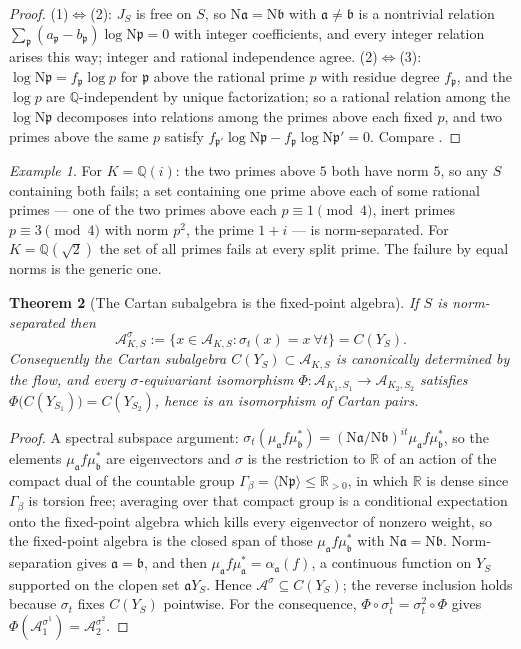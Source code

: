 \documentclass[11pt]{amsart}
\numberwithin{equation}{section}
\newtheorem{theorem}{Theorem}[section]
\theoremstyle{definition}
\theoremstyle{remark}
\newtheorem{example}[theorem]{Example}
\newcommand{\Q}{\mathbb{Q}}
\newcommand{\R}{\mathbb{R}}
\newcommand{\cA}{\mathcal{A}}
\newcommand{\pp}{\mathfrak{p}}
\newcommand{\aaa}{\mathfrak{a}}
\newcommand{\bb}{\mathfrak{b}}
\newcommand{\Ns}{\mathrm{N}}
\begin{document}
\begin{proof}
(1)$\Leftrightarrow$(2): $J_S$ is free on $S$, so $\Ns\aaa=\Ns\bb$ with $\aaa\ne\bb$ is a
nontrivial relation $\sum_\pp(a_\pp-b_\pp)\log\Ns\pp=0$ with integer coefficients, and every
integer relation arises this way; integer and rational independence agree.
(2)$\Leftrightarrow$(3): $\log\Ns\pp=f_\pp\log p$ for $\pp$ above the rational prime $p$ with
residue degree $f_\pp$, and the $\log p$ are $\Q$-independent by unique factorization; so
a rational relation among the $\log\Ns\pp$ decomposes into relations among the primes above
each fixed $p$, and two primes above the same $p$ satisfy
$f_{\pp'}\log\Ns\pp-f_\pp\log\Ns\pp'=0$. Compare \cite[Lem.~4.1]{SeriesI}.
\end{proof}

\begin{example}\label{ex:fail}
For $K=\Q(i)$: the two primes above $5$ both have norm $5$, so any $S$ containing both fails;
a set containing one prime above each of some rational primes --- one of the two primes
above each $p\equiv1\pmod4$, inert primes $p\equiv3\pmod4$ with norm $p^2$, the prime $1+i$
--- is norm-separated. For $K=\Q(\sqrt2)$ the set of all primes fails at every split prime.
The failure by equal norms is the generic one.
\end{example}

\begin{theorem}[The Cartan subalgebra is the fixed-point algebra]\label{thm:fixed}
If $S$ is norm-separated then
\begin{equation}\label{eq:fixed}
\cA_{K,S}^{\sigma}:=\bigl\{x\in\cA_{K,S}:\sigma_t(x)=x\ \forall t\bigr\}=C(Y_S).
\end{equation}
Consequently the Cartan subalgebra $C(Y_S)\subset\cA_{K,S}$ is canonically determined by
the flow, and every $\sigma$-equivariant isomorphism
$\Phi:\cA_{K_1,S_1}\to\cA_{K_2,S_2}$ satisfies $\Phi\bigl(C(Y_{S_1})\bigr)=C(Y_{S_2})$, hence
is an isomorphism of Cartan pairs.
\end{theorem}

\begin{proof}
A spectral subspace argument: $\sigma_t(\mu_\aaa f\mu_\bb^*)=(\Ns\aaa/\Ns\bb)^{it}\mu_\aaa f\mu_\bb^*$,
so the elements $\mu_\aaa f\mu_\bb^*$ are eigenvectors and $\sigma$ is the restriction to
$\R$ of an action of the compact dual of the countable group $\Gamma_\beta=\langle\Ns\pp\rangle\le\R_{>0}$,
in which $\R$ is dense since $\Gamma_\beta$ is torsion free; averaging over that compact group
is a conditional expectation onto the fixed-point algebra which kills every eigenvector of
nonzero weight, so the fixed-point algebra is the closed span of those $\mu_\aaa f\mu_\bb^*$
with $\Ns\aaa=\Ns\bb$. Norm-separation gives $\aaa=\bb$, and then
$\mu_\aaa f\mu_\aaa^*=\alpha_\aaa(f)$, a continuous function on $Y_S$ supported on the clopen
set $\aaa Y_S$. Hence $\cA^\sigma\subseteq C(Y_S)$; the reverse inclusion holds because
$\sigma_t$ fixes $C(Y_S)$ pointwise. For the consequence, $\Phi\circ\sigma^1_t=\sigma^2_t\circ\Phi$
gives $\Phi(\cA_1^{\sigma^1})=\cA_2^{\sigma^2}$.
\end{proof}
\end{document}
